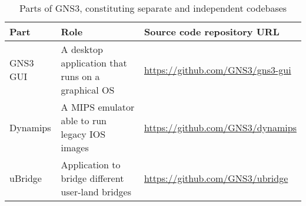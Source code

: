 \begin{table}
  \centering
  \small
  \begin{tabulary}{0.95\textwidth}{lLL}
    \toprule
      \textbf{Part}       & \textbf{Role}                                                                             & \textbf{Source code repository URL}\\
    \midrule
      GNS3 GUI            & A desktop application that runs on a graphical OS                                         & \scriptsize\url{https://github.com/GNS3/gns3-gui}\\
      Dynamips            & A MIPS emulator able to run legacy IOS images                                             & \scriptsize\url{https://github.com/GNS3/dynamips}\\
      uBridge             & Application to bridge different user-land bridges                                         & \scriptsize\url{https://github.com/GNS3/ubridge}\\

    \bottomrule
  \end{tabulary}
  \caption{%
    Parts of GNS3, constituting separate and independent codebases
  }
  \label{tab:gns3components}
\end{table}
